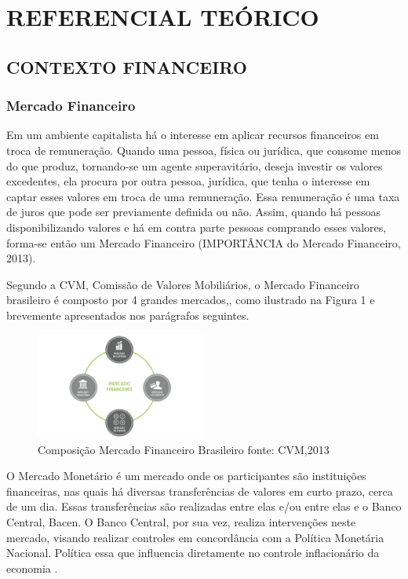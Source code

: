 
\newpage

\chapter[REFERENCIAL TEORICO]{REFERENCIAL TEÓRICO}
\section{CONTEXTO FINANCEIRO}
\subsection{Mercado Financeiro}

Em um ambiente capitalista há o interesse em aplicar recursos financeiros em troca de remuneração. Quando uma pessoa, física ou jurídica, que consome menos do que produz, tornando-se um agente superavitário, deseja investir os valores excedentes, ela procura por outra pessoa, jurídica, que tenha o interesse em captar esses valores em troca de uma remuneração. Essa remuneração é uma taxa de juros que pode ser previamente definida ou não. Assim, quando há pessoas disponibilizando valores e há em contra parte pessoas comprando esses valores, forma-se então um Mercado Financeiro (IMPORTÂNCIA do Mercado Financeiro, 2013).

Segundo a CVM, Comissão de Valores Mobiliários, o Mercado Financeiro brasileiro é composto por 4 grandes mercados,\cite[p. 15]{cmv2014}, como ilustrado na Figura 1 e brevemente apresentados nos parágrafos seguintes.

\begin{figure}[h]
\centering
\label{f01}
\includegraphics[width=0.5\textwidth]{figuras/f01}
\caption{Composição Mercado Financeiro Brasileiro  \newline fonte: CVM,2013}

\end{figure}

O Mercado Monetário é um mercado onde os participantes são instituições financeiras, nas quais há diversas transferências de valores em curto prazo, cerca de um dia. Essas transferências são realizadas entre elas e/ou entre elas e o Banco Central, Bacen. O Banco Central, por sua vez, realiza intervenções neste mercado, visando realizar controles em concordância com a Política Monetária Nacional. Política essa que influencia diretamente no controle inflacionário da economia \cite[p. 32]{cmv2014}.

